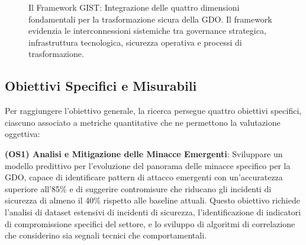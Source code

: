 \begin{figure}[htbp]
\caption{Il Framework GIST: Integrazione delle quattro dimensioni fondamentali per la trasformazione sicura della GDO. Il framework evidenzia le interconnessioni sistemiche tra governance strategica, infrastruttura tecnologica, sicurezza operativa e processi di trasformazione.}
\label{fig:gist_framework}
\end{figure}

\subsection{Obiettivi Specifici e Misurabili}

Per raggiungere l'obiettivo generale, la ricerca persegue quattro obiettivi specifici, ciascuno associato a metriche quantitative che ne permettono la valutazione oggettiva:

\textbf{(OS1) Analisi e Mitigazione delle Minacce Emergenti}: Sviluppare un modello predittivo per l'evoluzione del panorama delle minacce specifico per la GDO, capace di identificare pattern di attacco emergenti con un'accuratezza superiore all'85\% e di suggerire contromisure che riducano gli incidenti di sicurezza di almeno il 40\% rispetto alle baseline attuali. Questo obiettivo richiede l'analisi di dataset estensivi di incidenti di sicurezza, l'identificazione di indicatori di compromissione specifici del settore, e lo sviluppo di algoritmi di correlazione che considerino sia segnali tecnici che comportamentali.

